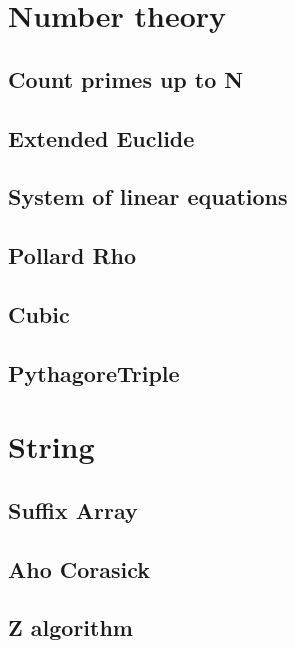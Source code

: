 \section{Number theory}
\subsection{Count primes up to N}
\raggedbottom
\hrulefill
\subsection{Extended Euclide}
\raggedbottom
\hrulefill
\subsection{System of linear equations}
\raggedbottom
\hrulefill
\subsection{Pollard Rho}
\raggedbottom
\hrulefill
\subsection{Cubic}
\raggedbottom
\hrulefill
\subsection{PythagoreTriple}
\raggedbottom
\hrulefill

\section{String}
\subsection{Suffix Array}
\raggedbottom
\hrulefill
\subsection{Aho Corasick}
\raggedbottom
\hrulefill
\subsection{Z algorithm}
\raggedbottom
\hrulefill
